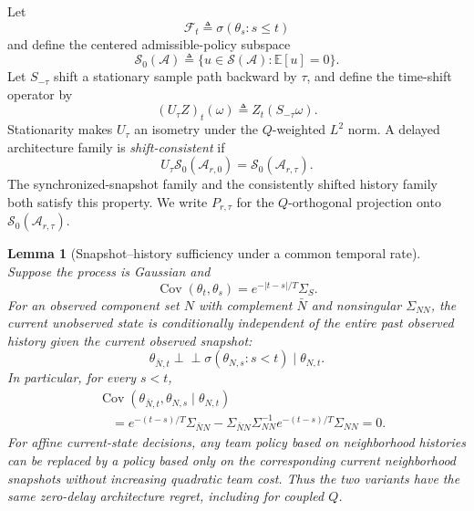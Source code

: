 \documentclass[11pt]{article}
\newtheorem{lemma}{Lemma}
\begin{document}
Let
\begin{equation}
\mathcal F_t\triangleq\sigma(\theta_s:s\le t)
\label{eq:environment_history}
\end{equation}
and define the centered admissible-policy subspace
\begin{equation}
\mathcal S_0(\mathcal A)
\triangleq
\{u\in\mathcal S(\mathcal A):\mathbb E[u]=0\}.
\label{eq:centered_policy_subspace}
\end{equation}
Let $S_{-\tau}$ shift a stationary sample path backward by $\tau$, and define
the time-shift operator by
\begin{equation}
  (U_\tau Z)_t(\omega)\triangleq Z_t(S_{-\tau}\omega).
  \label{eq:time_shift_operator}
\end{equation}
Stationarity makes $U_\tau$ an isometry under the $Q$-weighted $L^2$ norm.
A delayed architecture family is \emph{shift-consistent} if
\begin{equation}
  U_\tau\mathcal S_0(\mathcal A_{r,0})
  =\mathcal S_0(\mathcal A_{r,\tau}).
  \label{eq:shift_consistency}
\end{equation}
The synchronized-snapshot family and the consistently shifted history family
both satisfy this property. We write
$P_{r,\tau}$ for the $Q$-orthogonal projection onto
$\mathcal S_0(\mathcal A_{r,\tau})$.

\begin{lemma}[Snapshot--history sufficiency under a common temporal rate]
\label{lem:snapshot_history_sufficiency}
Suppose the process is Gaussian and
\begin{equation}
\operatorname{Cov}(\theta_t,\theta_s)
=e^{-|t-s|/T}\Sigma_S.
\label{eq:common_rate_covariance_recalled}
\end{equation}
For an observed component set $N$ with complement $\bar N$ and nonsingular
$\Sigma_{NN}$, the current unobserved state is conditionally independent of the
entire past observed history given the current observed snapshot:
\begin{equation}
\theta_{\bar N,t}\perp\!\!\!\perp
\sigma(\theta_{N,s}:s<t)\mid\theta_{N,t}.
\label{eq:snapshot_history_conditional_independence}
\end{equation}
In particular, for every $s<t$,
\begin{align}
&\operatorname{Cov}\!\left(
\theta_{\bar N,t},\theta_{N,s}\mid\theta_{N,t}
\right)\nonumber\\
&\quad=
e^{-(t-s)/T}\Sigma_{\bar N N}
-\Sigma_{\bar N N}\Sigma_{NN}^{-1}
 e^{-(t-s)/T}\Sigma_{NN}
=0.
\label{eq:snapshot_history_conditional_covariance}
\end{align}
For affine current-state decisions, any team policy based on neighborhood
histories can be replaced by a policy based only on the corresponding current
neighborhood snapshots without increasing quadratic team cost. Thus the two
variants have the same zero-delay architecture regret, including for coupled
$Q$.
\end{lemma}
\end{document}
